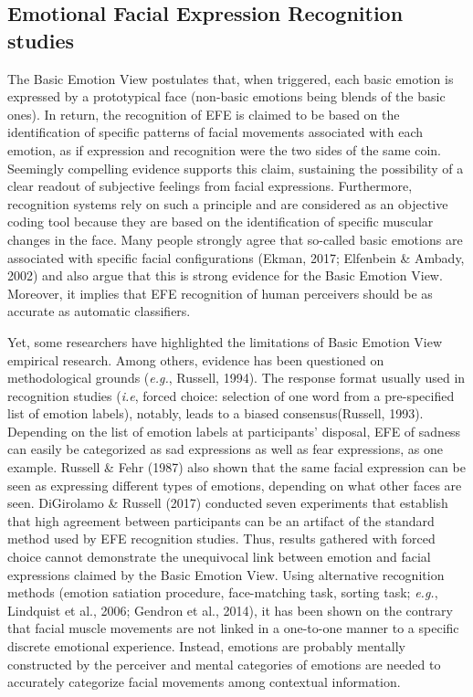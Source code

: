 \documentclass[
  english,
  man]{apa7}
\begin{document}
\hypertarget{emotional-facial-expression-recognition-studies}{%
\subsection{Emotional Facial Expression Recognition studies}\label{emotional-facial-expression-recognition-studies}}

The Basic Emotion View postulates that, when triggered, each basic emotion is expressed by a prototypical face (non-basic emotions being blends of the basic ones). In return, the recognition of EFE is claimed to be based on the identification of specific patterns of facial movements associated with each emotion, as if expression and recognition were the two sides of the same coin. Seemingly compelling evidence supports this claim, sustaining the possibility of a clear readout of subjective feelings from facial expressions. Furthermore, recognition systems rely on such a principle and are considered as an objective coding tool because they are based on the identification of specific muscular changes in the face. Many people strongly agree that so-called basic emotions are associated with specific facial configurations (Ekman, 2017; Elfenbein \& Ambady, 2002) and also argue that this is strong evidence for the Basic Emotion View. Moreover, it implies that EFE recognition of human perceivers should be as accurate as automatic classifiers.

Yet, some researchers have highlighted the limitations of Basic Emotion View empirical research. Among others, evidence has been questioned on methodological grounds (\emph{e.g.}, Russell, 1994). The response format usually used in recognition studies (\emph{i.e}, forced choice: selection of one word from a pre-specified list of emotion labels), notably, leads to a biased consensus(Russell, 1993). Depending on the list of emotion labels at participants' disposal, EFE of sadness can easily be categorized as sad expressions as well as fear expressions, as one example. Russell \& Fehr (1987) also shown that the same facial expression can be seen as expressing different types of emotions, depending on what other faces are seen. DiGirolamo \& Russell (2017) conducted seven experiments that establish that high agreement between participants can be an artifact of the standard method used by EFE recognition studies. Thus, results gathered with forced choice cannot demonstrate the unequivocal link between emotion and facial expressions claimed by the Basic Emotion View. Using alternative recognition methods (emotion satiation procedure, face-matching task, sorting task; \emph{e.g.}, Lindquist et al., 2006; Gendron et al., 2014), it has been shown on the contrary that facial muscle movements are not linked in a one-to-one manner to a specific discrete emotional experience. Instead, emotions are probably mentally constructed by the perceiver and mental categories of emotions are needed to accurately categorize facial movements among contextual information.
\end{document}
